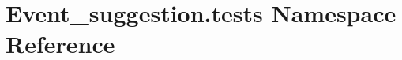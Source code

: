 \hypertarget{namespaceEvent__suggestion_1_1tests}{}\section{Event\+\_\+suggestion.\+tests Namespace Reference}
\label{namespaceEvent__suggestion_1_1tests}
